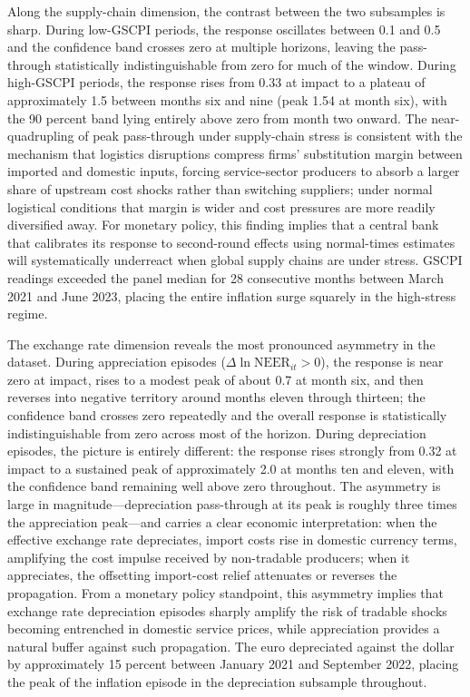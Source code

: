 \documentclass[a4paper,12pt]{article}
\begin{document}
Along the supply-chain dimension, the contrast between the two subsamples is sharp. During low-GSCPI periods, the response oscillates between 0.1 and 0.5 and the confidence band crosses zero at multiple horizons, leaving the pass-through statistically indistinguishable from zero for much of the window. During high-GSCPI periods, the response rises from 0.33 at impact to a plateau of approximately 1.5 between months six and nine (peak 1.54 at month six), with the 90 percent band lying entirely above zero from month two onward. The near-quadrupling of peak pass-through under supply-chain stress is consistent with the mechanism that logistics disruptions compress firms' substitution margin between imported and domestic inputs, forcing service-sector producers to absorb a larger share of upstream cost shocks rather than switching suppliers; under normal logistical conditions that margin is wider and cost pressures are more readily diversified away. For monetary policy, this finding implies that a central bank that calibrates its response to second-round effects using normal-times estimates will systematically underreact when global supply chains are under stress. GSCPI readings exceeded the panel median for 28 consecutive months between March 2021 and June 2023, placing the entire inflation surge squarely in the high-stress regime.

The exchange rate dimension reveals the most pronounced asymmetry in the dataset. During appreciation episodes ($\Delta\ln\mathrm{NEER}_{it} > 0$), the response is near zero at impact, rises to a modest peak of about 0.7 at month six, and then reverses into negative territory around months eleven through thirteen; the confidence band crosses zero repeatedly and the overall response is statistically indistinguishable from zero across most of the horizon. During depreciation episodes, the picture is entirely different: the response rises strongly from 0.32 at impact to a sustained peak of approximately 2.0 at months ten and eleven, with the confidence band remaining well above zero throughout. The asymmetry is large in magnitude---depreciation pass-through at its peak is roughly three times the appreciation peak---and carries a clear economic interpretation: when the effective exchange rate depreciates, import costs rise in domestic currency terms, amplifying the cost impulse received by non-tradable producers; when it appreciates, the offsetting import-cost relief attenuates or reverses the propagation. From a monetary policy standpoint, this asymmetry implies that exchange rate depreciation episodes sharply amplify the risk of tradable shocks becoming entrenched in domestic service prices, while appreciation provides a natural buffer against such propagation. The euro depreciated against the dollar by approximately 15 percent between January 2021 and September 2022, placing the peak of the inflation episode in the depreciation subsample throughout.
\end{document}
